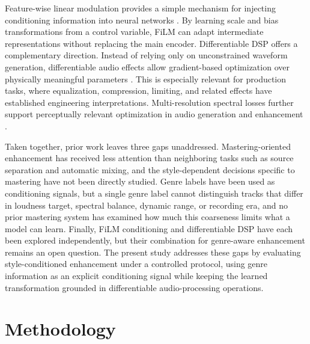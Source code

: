 \documentclass[journal]{IEEEtran}
\begin{document}
Feature-wise linear modulation provides a simple mechanism for injecting conditioning information into neural networks \cite{perez2018film}. By learning scale and bias transformations from a control variable, FiLM can adapt intermediate representations without replacing the main encoder. Differentiable DSP offers a complementary direction. Instead of relying only on unconstrained waveform generation, differentiable audio effects allow gradient-based optimization over physically meaningful parameters \cite{engel2020ddsp,ramirez2021differentiable}. This is especially relevant for production tasks, where equalization, compression, limiting, and related effects have established engineering interpretations. Multi-resolution spectral losses further support perceptually relevant optimization in audio generation and enhancement \cite{steinmetz2020auraloss,yamamoto2020parallel}.

Taken together, prior work leaves three gaps unaddressed. Mastering-oriented enhancement has received less attention than neighboring tasks such as source separation and automatic mixing, and the style-dependent decisions specific to mastering have not been directly studied. Genre labels have been used as conditioning signals, but a single genre label cannot distinguish tracks that differ in loudness target, spectral balance, dynamic range, or recording era, and no prior mastering system has examined how much this coarseness limits what a model can learn. Finally, FiLM conditioning and differentiable DSP have each been explored independently, but their combination for genre-aware enhancement remains an open question. The present study addresses these gaps by evaluating style-conditioned enhancement under a controlled protocol, using genre information as an explicit conditioning signal while keeping the learned transformation grounded in differentiable audio-processing operations.

\section{Methodology}
\end{document}
